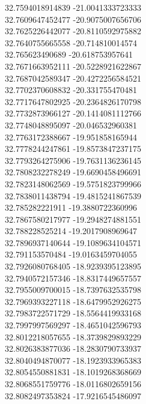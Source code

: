 {32.7594018914839	-21.0041333723333\\
32.7609647452477	-20.9075007656706\\
32.7625226442077	-20.8110592975882\\
32.7640755665558	-20.714810014574\\
32.765623490689	-20.618753957641\\
32.7671663952111	-20.5228921622867\\
32.7687042589347	-20.4272256584521\\
32.7702370608832	-20.331755470481\\
32.7717647802925	-20.2364826170798\\
32.7732873966127	-20.1414081112766\\
32.7748048895097	-20.046532960381\\
32.7763172388667	-19.951858165944\\
32.7778244247861	-19.8573847237175\\
32.7793264275906	-19.7631136236145\\
32.7808232278249	-19.6690458496691\\
32.7823148062569	-19.5751823799966\\
32.7838011438794	-19.4815241867539\\
32.785282221911	-19.3880722360996\\
32.7867580217977	-19.2948274881551\\
32.788228525214	-19.2017908969647\\
32.7896937140644	-19.1089634104571\\
32.791153570484	-19.0163459704055\\
32.7926080768405	-18.9239395123895\\
32.7940572157346	-18.8317449657557\\
32.7955009700015	-18.7397632535798\\
32.7969393227118	-18.6479952926275\\
32.7983722571729	-18.5564419933168\\
32.7997997569297	-18.4651042596793\\
32.8012218057655	-18.3739829893229\\
32.8026383877036	-18.2830790733937\\
32.8040494870077	-18.1923933965383\\
32.8054550881831	-18.1019268368669\\
32.8068551759776	-18.0116802659156\\
32.8082497353824	-17.9216545486097\\
}
